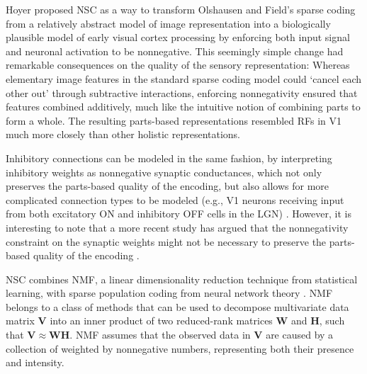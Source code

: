 Hoyer \cite{Hoyer2002,Hoyer2003} proposed \ac{NSC} as a way 
to transform Olshausen and Field's sparse coding 
from a relatively abstract model of image representation 
into a biologically plausible model of early visual cortex processing
by enforcing both input signal and neuronal activation to be nonnegative.
This seemingly simple change had remarkable consequences on the quality of the
sensory representation:
Whereas elementary image features in the standard sparse coding model could
`cancel each other out' through subtractive interactions,
enforcing nonnegativity ensured that features combined additively,
much like the intuitive notion of combining parts to form a whole.
The resulting parts-based representations resembled \acp{RF} in \ac{V1} 
much more closely than other holistic representations.

Inhibitory connections can be modeled in the same fashion,
by interpreting inhibitory weights as nonnegative synaptic conductances,
which not only
preserves the parts-based quality of the encoding,
but also allows for more complicated connection types to be modeled
(e.g., \ac{V1} neurons receiving input from both excitatory ON
and inhibitory OFF cells in the \ac{LGN})
\cite{Hoyer2003}.
However, it is interesting to note that a more recent study has argued
that the nonnegativity constraint on the
synaptic weights might not be necessary to preserve the parts-based quality of
the encoding \cite{Liu2017}.


\Ac{NSC} combines \ac{NMF}, a linear dimensionality reduction technique from statistical learning, with sparse population coding from neural network theory \cite{Hoyer2002,EggertKorner2004}.
\Ac{NMF} belongs to a class of methods that can be used to decompose multivariate data matrix \textbf{V} into an inner product of two reduced-rank matrices \textbf{W} and \textbf{H}, such that $\mathbf{V} \approx \mathbf{WH}$. \Ac{NMF} assumes that the observed data in \textbf{V} are caused by a collection of 
weighted by nonnegative numbers, representing both their presence and intensity.

